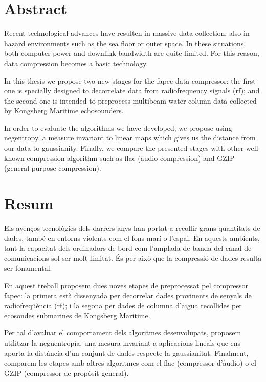 \chapter*{Abstract}
Recent technological advances have resulten in massive data collection, also in hazard environments such as the sea floor or outer space. In these situations, both computer power and downlink bandwidth are quite limited. For this reason, data compression becomes a basic technology.

In this thesis we propose two new stages for the \acrshort{fapec} data compressor: the first one is specially designed to decorrelate data from radiofrequency signals (\acrshort{rf}); and the second one is intended to preprocess multibeam water column data collected by Kongsberg Maritime echosounders.

In order to evaluate the algorithms we have developed, we propose using negentropy, a measure invariant to linear maps which gives us the distance from our data to gaussianity. Finally, we compare the presented stages with other well-known compression algorithm such as \acrshort{flac} (audio compression) and GZIP (general purpose compression).

\chapter*{Resum}
Els avenços tecnològics dels darrers anys han portat a recollir grans quantitats de dades, també en entorns violents com el fons marí o l’espai. En aquests ambients, tant la capacitat dels ordinadors de bord com l’amplada de banda del canal de comunicacions sol ser molt limitat. És per això que la compressió de dades resulta ser fonamental.

En aquest treball proposem dues noves etapes de preprocessat pel compressor \acrshort{fapec}: la primera està dissenyada per decorrelar dades provinents de senyals de radiofreqüència (\acrshort{rf}); i la segona per dades de columna d’aigua recollides per ecosondes submarines de Kongsberg Maritime.

Per tal d’avaluar el comportament dels algoritmes desenvolupats, proposem utilitzar la neguentropia, una mesura invariant a aplicacions lineals que ens aporta la distància d’un conjunt de dades respecte la gaussianitat. Finalment, comparem les etapes amb altres algoritmes com el \acrshort{flac} (compressor d’àudio) o el GZIP (compressor de propòsit general).